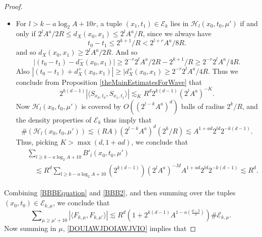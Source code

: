 \begin{proof}
\begin{itemize}
    \item For $l > k - a \log_2 A + 10 r$, a tuple $(x_1,t_1) \in \mathcal{E}_k$ lies in $\mathcal{H}_l(x_0,t_0,\mu')$ if and only if $2^l A^a / 2 R \leq d_X(x_0,x_1) \leq 2^l A^a / R$, since we always have
    \begin{equation}
         t_0 - t_1 \leq 2^{k+1}/R < 2^{l+r} A^a / 8R.
    \end{equation}
    and so $d_X(x_0,x_1) \geq 2^l A^a / 2R$. And so 
    \[ |(t_0 - t_1) - d_X^-(x_0,x_1)| \geq 2^{-r} 2^l A^a / 2R - 2^{k+1} / R \geq 2^{-r} 2^l A^a / 4R. \]
    Also $|(t_0 - t_1) + d_X^+(x_0,x_1)| \geq |d_X^+(x_0,x_1) \geq 2^{-r} 2^l A^a / 4R$. Thus we conclude from Proposition \ref{theMainEstimatesForWave} that
    \begin{equation}
        2^{k(d-1)} |\langle {S\!}_{x_0,t_0}, {S\!}_{x_1,t_1} \rangle| \lesssim_K R^{d} 2^{k(d-1)} (2^l A^a)^{- K}.
    \end{equation}
    Now $\mathcal{H}_l(x_0,t_0,\mu')$ is covered by $O( (2^{l-k} A^a)^d )$ balls of radius $2^k / R$, and the density properties of $\mathcal{E}_k$ thus imply that
    \begin{equation}
        \#(\mathcal{H}_l(x_0,t_0,\mu')) \lesssim (RA) (2^{l-k} A^a)^d ( 2^k / R ) \lesssim A^{1 + ad} 2^{ld} 2^{-k(d-1)}.
    \end{equation}
    Thus, picking $K > \max(d,1+ad)$, we conclude that
    \begin{align} \label{BBB2}
    \begin{split}
        &\sum\nolimits_{l \geq k - a \log_2 A + 10} B'_l(x_0,t_0,\mu')\\
        &\quad \lesssim R^{d} \sum\nolimits_{l \geq k - a \log_2 A + 10} (2^{k(d-1)}) (2^l A^a)^{-M} A^{1 + ad} 2^{ld} 2^{-k(d-1)} \lesssim R^{d}.
    \end{split}
    \end{align}
    \end{itemize}
    Combining \eqref{BBBEquation} and \eqref{BBB2}, and then summing over the tuples $(x_0,t_0) \in \mathcal{E}_{k,\mu}$, we conclude that
    \begin{equation} \label{DOUIAWJDOIAWJVIO}
        \sum\nolimits_{\mu \geq \mu' + 10} |\langle F_{k,\mu}, F_{k,\mu'} \rangle| \lesssim R^{d} \left( 1 + 2^{k(d-1)} A^{1 - a \left( \frac{d-3}{2} \right)} \right) \# \mathcal{E}_{k,\mu}.
    \end{equation}
    Now summing in $\mu$, \eqref{DOUIAWJDOIAWJVIO} implies that

\end{proof}
